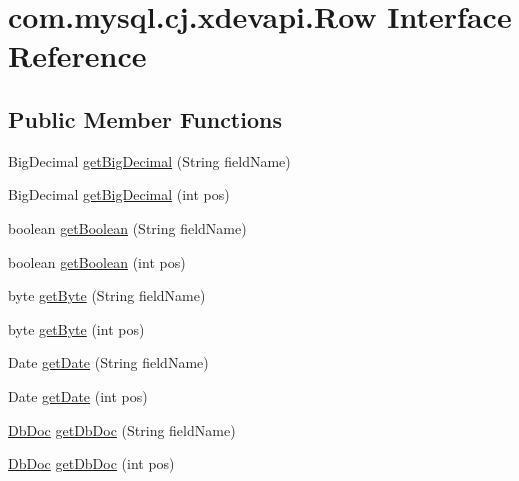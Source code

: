 \hypertarget{interfacecom_1_1mysql_1_1cj_1_1xdevapi_1_1_row}{}\section{com.\+mysql.\+cj.\+xdevapi.\+Row Interface Reference}
\label{interfacecom_1_1mysql_1_1cj_1_1xdevapi_1_1_row}
\subsection*{Public Member Functions}
\begin{DoxyCompactItemize}
\item 
Big\+Decimal \mbox{\hyperlink{interfacecom_1_1mysql_1_1cj_1_1xdevapi_1_1_row_a9156481badcdd629901b26f56e85aa3b}{get\+Big\+Decimal}} (String field\+Name)
\item 
Big\+Decimal \mbox{\hyperlink{interfacecom_1_1mysql_1_1cj_1_1xdevapi_1_1_row_ad42dea464dbed995ab6462661de3a794}{get\+Big\+Decimal}} (int pos)
\item 
boolean \mbox{\hyperlink{interfacecom_1_1mysql_1_1cj_1_1xdevapi_1_1_row_a9f2cb54221ed0600ce68e1f4638cce26}{get\+Boolean}} (String field\+Name)
\item 
boolean \mbox{\hyperlink{interfacecom_1_1mysql_1_1cj_1_1xdevapi_1_1_row_a6bdc2eced8a64d11edd870fbcf7f68d4}{get\+Boolean}} (int pos)
\item 
byte \mbox{\hyperlink{interfacecom_1_1mysql_1_1cj_1_1xdevapi_1_1_row_a33e5c8facc799a0c3e23370dab0ed23d}{get\+Byte}} (String field\+Name)
\item 
byte \mbox{\hyperlink{interfacecom_1_1mysql_1_1cj_1_1xdevapi_1_1_row_a212afbaef90eab08bafff869c13acdac}{get\+Byte}} (int pos)
\item 
Date \mbox{\hyperlink{interfacecom_1_1mysql_1_1cj_1_1xdevapi_1_1_row_adf47f80156d2ff52d9cf7fc9fde20718}{get\+Date}} (String field\+Name)
\item 
Date \mbox{\hyperlink{interfacecom_1_1mysql_1_1cj_1_1xdevapi_1_1_row_ae6b06eca2a1ca3b9f115d6c93fa1b3ac}{get\+Date}} (int pos)
\item 
\mbox{\hyperlink{interfacecom_1_1mysql_1_1cj_1_1xdevapi_1_1_db_doc}{Db\+Doc}} \mbox{\hyperlink{interfacecom_1_1mysql_1_1cj_1_1xdevapi_1_1_row_ad06ed5cd59016c29578ad2a34219bbbe}{get\+Db\+Doc}} (String field\+Name)
\item 
\mbox{\hyperlink{interfacecom_1_1mysql_1_1cj_1_1xdevapi_1_1_db_doc}{Db\+Doc}} \mbox{\hyperlink{interfacecom_1_1mysql_1_1cj_1_1xdevapi_1_1_row_a563b4f8cb5ae261ea36464e7d335e395}{get\+Db\+Doc}} (int pos)

\end{DoxyCompactItemize}
